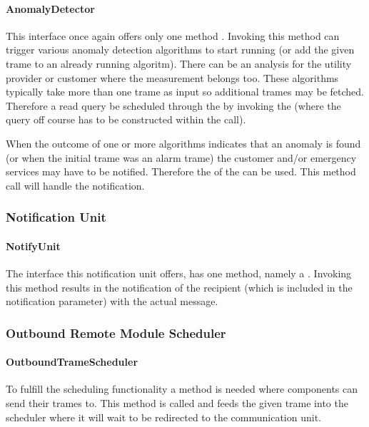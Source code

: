 \paragraph{AnomalyDetector}

\npar This interface once again offers only one method .
Invoking this method can trigger various anomaly detection algorithms to start
running (or add the given trame to an already running algoritm). There can be an
analysis for the utility provider or customer where the measurement belongs too.
These algorithms typically take more than one trame as input so additional
trames may be fetched. Therefore a read query be scheduled through the
 by invoking the  (where
the query off course has to be constructed within the  call).

\npar When the outcome of one or more algorithms indicates that an anomaly is
found (or when the initial trame was an alarm trame) the customer and/or emergency
services may have to be notified. Therefore the 
of the  can be used. This method call will handle the
notification.

\subsubsection{Notification Unit}

\paragraph{NotifyUnit}

\npar The interface this notification unit offers, has one method, namely a
. Invoking this method results in the notification of
the recipient (which is included in the notification parameter) with the actual
message.

\subsubsection{Outbound Remote Module Scheduler}

\paragraph{OutboundTrameScheduler}

\npar To fulfill the scheduling functionality a method is needed where
components can send their trames to. This method is called
 and feeds the given trame into the scheduler where it
will wait to be redirected to the communication unit.

